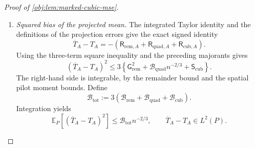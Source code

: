 \documentclass[11pt]{article}
\begin{document}
\begin{proof}[Proof of \cref{obj:lem:marked-cubic-mse}]
\begin{enumerate}
\item \textit{Squared bias of the projected mean.}
The integrated Taylor identity and the definitions of the projection errors give the exact signed identity
\[
\overline T_A-T_A
=
-\left(
\mathsf R_{\mathrm{rem},A}
+\mathsf R_{\mathrm{quad},A}
+\mathsf R_{\mathrm{cub},A}
\right).
\]
Using the three-term square inequality and the preceding majorants gives
\[
(\overline T_A-T_A)^2
\le
3\left\{
\mathsf G_{\mathrm{rem}}^2
+\mathcal B_{\mathrm{quad}}n^{-2/3}
+\mathsf S_{\mathrm{cub}}
\right\}.
\]
The right-hand side is integrable, by the remainder bound and the spatial pilot moment bounds. Define
\[
\mathcal B_{\mathrm{tot}}
:=3\left(
\mathcal B_{\mathrm{rem}}
+\mathcal B_{\mathrm{quad}}
+\mathcal B_{\mathrm{cub}}
\right).
\]
Integration yields
\[
\mathbb E_P[(\overline T_A-T_A)^2]
\le\mathcal B_{\mathrm{tot}}n^{-2/3},
\qquad
\overline T_A-T_A\in L^2(P).
\]


\end{enumerate}
\end{proof}
\end{document}

